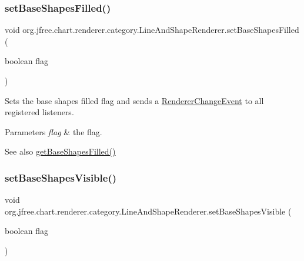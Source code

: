 \subsubsection{\texorpdfstring{set\+Base\+Shapes\+Filled()}{setBaseShapesFilled()}}
{\footnotesize\ttfamily void org.\+jfree.\+chart.\+renderer.\+category.\+Line\+And\+Shape\+Renderer.\+set\+Base\+Shapes\+Filled (\begin{DoxyParamCaption}\item[{boolean}]{flag }\end{DoxyParamCaption})}

Sets the base \textquotesingle{}shapes filled\textquotesingle{} flag and sends a \mbox{\hyperlink{}{Renderer\+Change\+Event}} to all registered listeners.


\begin{DoxyParams}{Parameters}
{\em flag} & the flag.\\
\hline
\end{DoxyParams}
\begin{DoxySeeAlso}{See also}
\mbox{\hyperlink{classorg_1_1jfree_1_1chart_1_1renderer_1_1category_1_1_line_and_shape_renderer_a3992bfda698327b88090c5c1ec73920b}{get\+Base\+Shapes\+Filled()}} 
\end{DoxySeeAlso}
\mbox{\label{classorg_1_1jfree_1_1chart_1_1renderer_1_1category_1_1_line_and_shape_renderer_afe46101c6cfb30fc225daaabe2899e9a}} 
\subsubsection{\texorpdfstring{set\+Base\+Shapes\+Visible()}{setBaseShapesVisible()}}
{\footnotesize\ttfamily void org.\+jfree.\+chart.\+renderer.\+category.\+Line\+And\+Shape\+Renderer.\+set\+Base\+Shapes\+Visible (\begin{DoxyParamCaption}\item[{boolean}]{flag }\end{DoxyParamCaption})}


